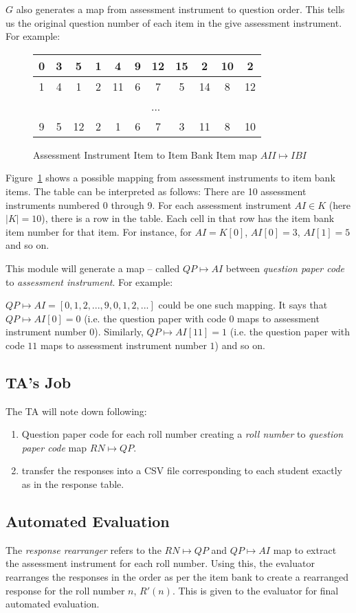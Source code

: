 \documentclass[12pt]{report}
\begin{document}
$G$ also generates a map from assessment instrument to question order. This tells us the original question number of each item in the give assessment instrument. For example:
\begin{figure}

\begin{center}
\begin{tabular}{|c|c|c|c|c|c|c|c|c|c|c|}
\hline
\cellcolor{Gray}0 & 3 & 5 & 1 & 4 & 9 & 12 & 15 & 2 & 10 & 2 \\
\hline
\cellcolor{Gray}1 & 4 & 1 & 2 & 11 & 6 & 7 & 5 & 14 & 8 & 12 \\
\hline
& \multicolumn{10}{|c|}{...} \\
\hline
\cellcolor{Gray}9 & 5 & 12 & 2 & 1 & 6 & 7 & 3 & 11 & 8 & 10 \\
\hline
\end{tabular}
\end{center}

\caption{Assessment Instrument Item to Item Bank Item map $AII \mapsto IBI$}
\label{f:aiiibi} 
\end{figure}

Figure~\ref{f:aiiibi} shows a possible mapping from assessment instruments to item bank items. The table can be interpreted as follows: There are 10 assessment instruments numbered 0 through 9. For each assessment instrument $AI \in K$ (here $|K| = 10$), there is a row in the table. Each cell in that row has the item bank item number for that item. For instance, for $AI = K[0]$, $AI[0] = 3$, $AI[1] = 5$ and so on.
  
This module will generate a map -- called $QP\mapsto AI$ between \emph{question paper code} to \emph{assessment instrument}. For example:

$QP\mapsto AI = [0, 1, 2, ..., 9, 0, 1, 2, ...]$ could be one such mapping. It says that $QP\mapsto AI[0] = 0$ (i.e. the question paper with code $0$ maps to assessment instrument number $0$). Similarly, $QP\mapsto AI[11] = 1$ (i.e. the question paper with code $11$ maps to assessment instrument number $1$) and so on.

\subsection{TA's Job}
The TA will note down following:
\begin{enumerate}
\item Question paper code for each roll number creating a \emph{roll number} to \emph{question paper code} map $RN\mapsto QP$.
\item transfer the responses into a CSV file corresponding to each student exactly as in the response table.
\end{enumerate}

\subsection{Automated Evaluation}
The \emph{response rearranger} refers to the $RN\mapsto QP$ and $QP\mapsto AI$ map to extract the assessment instrument for each roll number. Using this, the evaluator rearranges the responses in the order as per the item bank to create a rearranged response for the roll number $n$, $R'(n)$. This is given to the evaluator for final automated evaluation.
\end{document}
